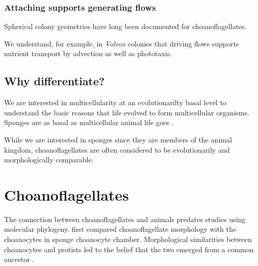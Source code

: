 
\subsubsection*{Attaching supports generating flows}
Spherical colony geometries have long been documented \citep{lauterborn1898} for choanoflagellates. 

We understand, for example, in \textit{Volvox} colonies that driving flows supports nutrient transport by advection as well as phototaxis. 


\subsection{Why differentiate?}

We are interested in multicellularity at an evolutionarilty basal level to understand the basic reasons that life evolved to form multicellular organisms. Sponges are as basal as multicellular animal life goes . 


While we are interested in sponges since they are members of the animal kingdom, choanoflagellates are often considered to be evolutionarily and morphologically comparable. 



\section{Choanoflagellates} \label{sec:choano} %


The connection between choanoflagellates and animals predates studies using molecular phylogeny. 
\citet{james1871} first compared choanoflagellate morphology with the choanocytes in sponge choanocyte chamber. 
Morphological similarities between choanocytes and protists led to the belief that the two emerged from a common ancestor \citep{saedeleer1930,tuzet1963}.

